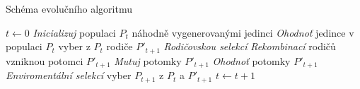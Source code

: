 

\begin{algorithm}
\caption{Schéma evolučního algoritmu}
\label{obreva}
\begin{algorithmic}
\State $t \gets 0$
\State \emph{Inicializuj} populaci $P_t$ náhodně vygenerovanými jedinci
\State \emph{Ohodnoť} jedince v populaci $P_t$
\State 	vyber z $P_t$ rodiče $P'_{t+1}$ \emph{Rodičovskou selekcí}
\State 	\emph{Rekombinací} rodičů vzniknou potomci $P'_{t+1}$
\State 	\emph{Mutuj} potomky $P'_{t+1}$
\State 	\emph{Ohodnoť} potomky $P'_{t+1}$
\State 	\emph{Enviromentální selekcí} vyber $P_{t+1}$ z $P_t$ a $P'_{t+1}$
\State $t \gets t+1$
\EndWhile
\EndProcedure
\end{algorithmic}
\end{algorithm}


